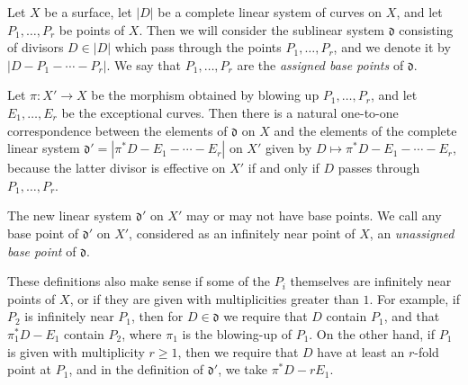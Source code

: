 {Let $X$ be a surface, let $|D|$ be a complete linear system of curves on $X$, and let $P_1,\ldots,P_r$ be points of $X$. Then we will consider the sublinear system $\mathfrak d$ consisting of divisors $D\in|D|$ which pass through the points $P_1,\ldots,P_r$, and we denote it by $|D-P_1-\cdots-P_r|$. We say that $P_1,\ldots,P_r$ are the \emph{assigned base points} of $\mathfrak d$.

Let $\pi\colon X'\to X$ be the morphism obtained by blowing up $P_1,\ldots,P_r$, and let $E_1,\ldots,E_r$ be the exceptional curves. Then there is a natural one-to-one correspondence between the elements of $\mathfrak d$ on $X$ and the elements of the complete linear system $\mathfrak d'=|\pi^*D-E_1-\cdots-E_r|$ on $X'$ given by $D\mapsto\pi^*D-E_1-\cdots-E_r$, because the latter divisor is effective on $X'$ if and only if $D$ passes through $P_1,\ldots,P_r$.

The new linear system $\mathfrak d'$ on $X'$ may or may not have base points. We call any base point of $\mathfrak d'$ on $X'$, considered as an infinitely near point of $X$, an \emph{unassigned base point} of $\mathfrak d$.

These definitions also make sense if some of the $P_i$ themselves are infinitely near points of $X$, or if they are given with multiplicities greater than $1$. For example, if $P_2$ is infinitely near $P_1$, then for $D\in\mathfrak d$ we require that $D$ contain $P_1$, and that $\pi_1^*D-E_1$ contain $P_2$, where $\pi_1$ is the blowing-up of $P_1$. On the other hand, if $P_1$ is given with multiplicity $r\ge1$, then we require that $D$ have at least an $r$-fold point at $P_1$, and in the definition of $\mathfrak d'$, we take $\pi^*D-rE_1$.
}
